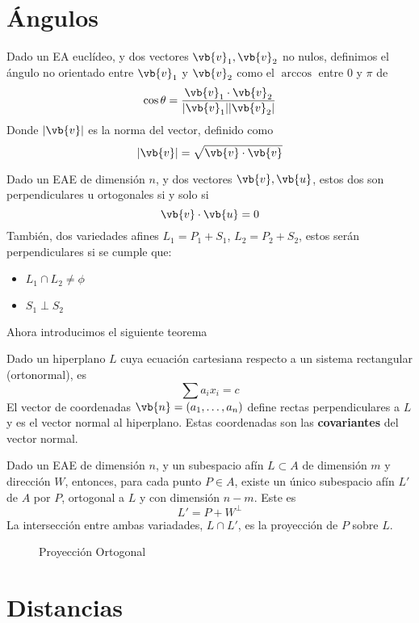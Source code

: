 \documentclass{./Geometria.tex}
\begin{document}
\section{Ángulos}
\begin{defin}
	Dado un EA euclídeo, y dos vectores $\vb{v}_{1}, \vb{v}_{2}$ no nulos, definimos el ángulo no orientado entre $\vb{v}_{1}$ y $\vb{v}_{2}$ como el $\arccos$ entre $0$ y $\pi$ de
	\[
		\cos \theta = \frac{\vb{v}_{1}\cdot \vb{v}_{2}}{|\vb{v}_{1}||\vb{v}_{2}|}
	\]
	Donde $|\vb{v}|$ es la norma del vector, definido como
	\[
		|\vb{v}| = \sqrt{\vb{v}\cdot \vb{v}}
	\]
\end{defin}
\begin{defin}[Perpendicularidad]
	Dado un EAE de dimensión $n$, y dos vectores $\vb{v}, \vb{u}$, estos dos son perpendiculares u ortogonales si y solo si
	\[
		\vb{v}\cdot \vb{u} = 0
	\]
	También, dos variedades afines $L_1=P_1+S_1$, $L_2=P_2+S_2$, estos serán perpendiculares si se cumple que:
	\begin{itemize}
		\item $L_1 \cap L_2 \neq \phi$
		\item $S_1 \perp S_2$ 
	\end{itemize}
\end{defin}
Ahora introducimos el siguiente teorema
\pagebreak
\begin{teorema}
	Dado un hiperplano $L$ cuya ecuación cartesiana respecto a un sistema rectangular (ortonormal), es
	\[
		\sum a_{i}x_{i} = c
	\]
	El vector de coordenadas $\vb{n} = (a_1,\dots ,a_{n})$ define rectas perpendiculares a $L$ y es el vector normal al hiperplano. Estas coordenadas son las \textbf{covariantes} del vector normal.  
\end{teorema}
\begin{defin}
	Dado un EAE de dimensión $n$, y un subespacio afín $L \subset A$ de dimensión $m$ y dirección $W$, entonces, para cada punto $P \in A$, existe un único subespacio afín $L'$ de $A$ por $P$, ortogonal a $L$ y con dimensión $n-m$. Este es
	\[
		L' = P + W^{\perp}
	\]
	La intersección entre ambas variadades, $L \cap L'$, es la proyección de $P$ sobre $L$.   
\end{defin}
\begin{figure}[ht]
    \centering
    \caption{Proyección Ortogonal}
    \label{fig:p-ortogonal}
\end{figure}
\pagebreak
\section{Distancias}
\end{document}
